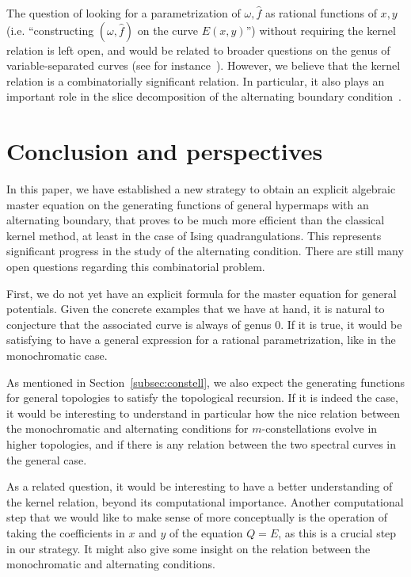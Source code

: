 \documentclass{scrartcl}
\newcommand\wh[1]{\widehat{#1}}
\begin{document}
The question of looking for a parametrization of $\omega,\wh{f}$ as rational functions of $x,y$ (i.e. ``constructing  $(\omega,\wh{f})$ on the curve $E(x,y)$'') without requiring the kernel relation is left open, and would be related to broader questions on the genus of variable-separated curves (see for instance~\cite{pakovich}). However, we believe that the kernel relation is a combinatorially significant relation. In particular, it also plays an important role in the slice decomposition of the alternating boundary condition~\cite{slices-alt}.

\section{Conclusion and perspectives}
\label{sec:ccl}

In this paper, we have established a new strategy to obtain an explicit algebraic master equation on the generating functions of general hypermaps with an alternating boundary, that proves to be much more efficient than the classical kernel method, at least in the case of Ising quadrangulations. This represents significant progress in the study of the alternating condition. There are still many open questions regarding this combinatorial problem.

First, we do not yet have an explicit formula for the master equation for general potentials. Given the concrete examples that we have at hand, it is natural to conjecture that the associated curve is always of genus 0. If it is true, it would be satisfying to have a general expression for a rational parametrization, like in the monochromatic case.

As mentioned in Section~\ref{subsec:constell}, we also expect the generating functions for general topologies to satisfy the topological recursion. If it is indeed the case, it would be interesting to understand in particular how the nice relation between the monochromatic and alternating conditions for $m$-constellations evolve in higher topologies, and if there is any relation between the two spectral curves in the general case. 

As a related question, it would be interesting to have a better understanding of the kernel relation, beyond its computational importance. Another computational step that we would like to make sense of more conceptually is the operation of taking the coefficients in $x$ and $y$ of the equation $Q=E$, as this is a crucial step in our strategy. It might also give some insight on the relation between the monochromatic and alternating conditions.
\end{document}
